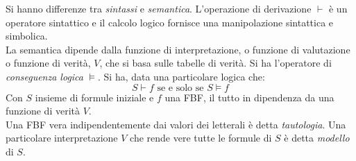 \documentclass[a4paper,12pt, oneside]{book}
\begin{document}
Si hanno differenze tra \textit{sintassi} e \textit{semantica}. L'operazione di derivazione $\vdash$ è un operatore sintattico e il calcolo logico fornisce una manipolazione sintattica e simbolica.\\
La semantica dipende dalla funzione di interpretazione, o funzione di valutazione o funzione di verità, $V$, che si basa sulle tabelle di verità. Si ha l'operatore di \textit{conseguenza logica} $\models$. Si ha, data una particolare logica che:
$$S\vdash f \mbox{ se e solo se } S\models f$$
Con $S$ insieme di formule iniziale e $f$ una FBF, il tutto in dipendenza da una funzione di verità $V$.\\
Una FBF vera indipendentemente dai valori dei letterali è detta \textit{tautologia}. Una particolare interpretazione $V$ che rende vere tutte le formule di $S$ è detta \textit{modello} di $S$.
\newpage
\end{document}

